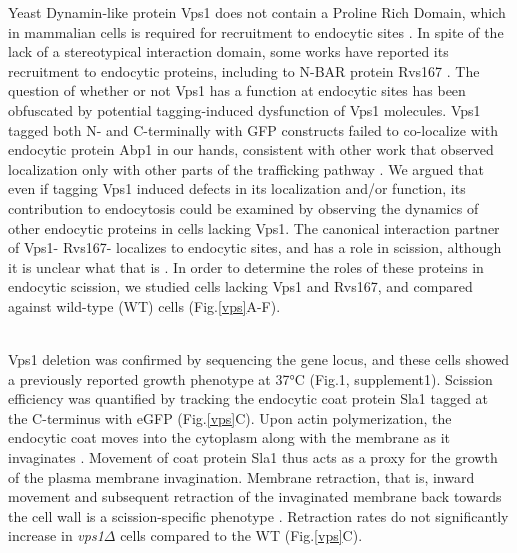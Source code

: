 \documentclass[9pt,lineno]{elife}
\begin{document}
Yeast Dynamin-like protein Vps1 does not contain a Proline Rich Domain, which in mammalian cells is required for recruitment to endocytic sites \cite{Grabs1997,Cestra1999,Farsad2001,Meinecke2013b}. In spite of the lack of a stereotypical interaction domain, some works have reported its recruitment to endocytic proteins, including to N-BAR protein Rvs167 \cite{Yu2004,Nannapaneni2010b,Rooij2010}. The question of whether or not Vps1 has a function at endocytic sites has been obfuscated by potential tagging-induced dysfunction of Vps1 molecules. Vps1 tagged both N- and C-terminally with GFP constructs failed to co-localize with endocytic protein Abp1 in our hands, consistent with other work that observed localization only with other parts of the trafficking pathway \cite{GoudGadila2017}. We argued that even if tagging Vps1 induced defects in its localization and/or function, its contribution to endocytosis could be examined by observing the dynamics of other endocytic proteins in cells lacking Vps1. The canonical interaction partner of Vps1- Rvs167- localizes to endocytic sites, and has a role in scission, although it is unclear what that is \cite{Kukulski2012,Picco2015}. In order to determine the roles of these proteins in endocytic scission, we studied cells lacking Vps1 and Rvs167, and compared against wild-type (WT) cells (Fig.\ref{vps}A-F).

~\\
Vps1 deletion was confirmed by sequencing the gene locus, and these cells showed a previously reported \cite{Rothman1986}  growth phenotype at 37\si{\degree}C (Fig.1, supplement1). Scission efficiency was quantified by tracking the endocytic coat protein Sla1 tagged at the C-terminus with eGFP (Fig.\ref{vps}C). Upon actin polymerization, the endocytic coat moves into the cytoplasm along with the membrane as it invaginates \cite{Skruzny2012}. Movement of coat protein Sla1 thus acts as a proxy for the growth of the plasma membrane invagination. Membrane retraction, that is, inward movement and subsequent retraction of the invaginated membrane back towards the cell wall is a scission-specific phenotype \cite{Kaksonen2005}. Retraction rates do not significantly increase in  \textit{vps1$\Delta$} cells compared to the WT (Fig.\ref{vps}C).
\end{document}
